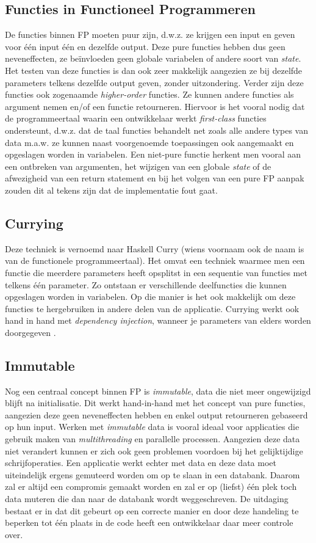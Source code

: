 \subsection{Functies in Functioneel Programmeren}
De functies binnen FP moeten puur zijn, d.w.z. ze krijgen een input en geven voor één input één en dezelfde output. Deze pure functies hebben dus geen neveneffecten, ze beïnvloeden geen globale variabelen of andere soort van \textit{state}. Het testen van deze functies is dan ook zeer makkelijk aangezien ze bij dezelfde parameters telkens dezelfde output geven, zonder uitzondering.
Verder zijn deze functies ook zogenaamde \textit{higher-order} functies. Ze kunnen andere functies als argument nemen en/of een functie retourneren. Hiervoor is het vooral nodig dat de programmeertaal waarin een ontwikkelaar werkt \textit{first-class} functies ondersteunt, d.w.z. dat de taal functies behandelt net zoals alle andere types van data m.a.w. ze kunnen naast voorgenoemde toepassingen ook aangemaakt en opgeslagen worden in variabelen. Een niet-pure functie herkent men vooral aan een ontbreken van argumenten, het wijzigen van een globale \textit{state} of de afwezigheid van een return statement en bij het volgen van een pure FP aanpak zouden dit al tekens zijn dat de implementatie fout gaat.

\subsection{Currying}
Deze techniek is vernoemd naar Haskell Curry (wiens voornaam ook de naam is van de functionele programmeertaal). Het omvat een techniek waarmee men een functie die meerdere parameters heeft opsplitst in een sequentie van functies met telkens één parameter. Zo ontstaan er verschillende deelfuncties die kunnen opgeslagen worden in variabelen. Op die manier is het ook makkelijk om deze functies te hergebruiken in andere delen van de applicatie. Currying werkt ook hand in hand met \textit{dependency injection}, wanneer je parameters van elders worden doorgegeven \autocite{Microsoft2019}.

\subsection{Immutable}
Nog een centraal concept binnen FP is \textit{immutable}, data die niet meer ongewijzigd blijft na initialisatie. Dit werkt hand-in-hand met het concept van pure functies, aangezien deze geen neveneffecten hebben en enkel output retourneren gebaseerd op hun input. Werken met \textit{immutable} data is vooral ideaal voor applicaties die gebruik maken van \textit{multithreading} en parallelle processen. Aangezien deze data niet verandert kunnen er zich ook geen problemen voordoen bij het gelijktijdige schrijfoperaties. Een applicatie werkt echter met data en deze data moet uiteindelijk ergens gemuteerd worden om op te slaan in een databank. Daarom zal er altijd een compromis gemaakt worden en zal er op (liefst) één plek toch data muteren die dan naar de databank wordt weggeschreven. De uitdaging bestaat er in dat dit gebeurt op een correcte manier en door deze handeling te beperken tot één plaats in de code heeft een ontwikkelaar daar meer controle over.

